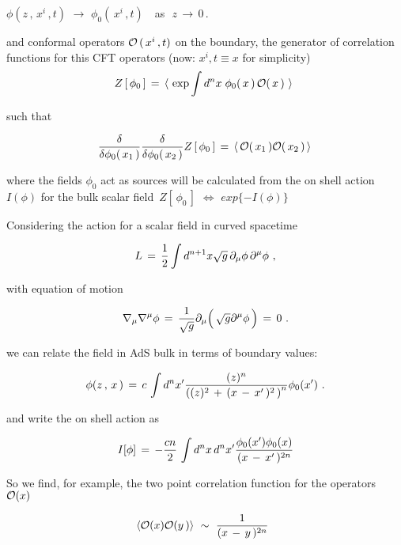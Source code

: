 \documentclass[a4paper,twocolumn,prd,groupedaddress,nofootinbib]{revtex4}
\begin{document}
\bigskip
 $\phi (z\,,\,x^i\,,t)\,\,\rightarrow\,\,
\phi_0 (\,x^i\,,t )\,\,\,\,$  
as  $\,\,z\,\rightarrow\,0\,$.

\vskip1cm

\noindent and conformal operators ${\cal O}\,(\,x^i\,,t )$ on the boundary, 
the generator of correlation functions for this  CFT operators
(now: $x^i,t \equiv x$ for simplicity) 
$$
Z\,[\,\phi_0 \,]\,=\, \langle \,\,\exp \int d^{n}x\; \phi_0 (\,x\,)\,
{\cal O} (\,x\,)\,\,\rangle\,\,
\nonumber
$$

\noindent such that


$$ 
{\delta\over \delta \phi_0 (\,x_1\,) } {\delta\over \delta \phi_0 (\,x_2\,) }
Z\,[\,\phi_0\,]\,=\,\langle \, { \cal O } (\,x_1\,){\cal O} (\,x_2\,)\,\rangle\,
$$
 
\bigskip

\noindent  where the fields $\phi_0 $ act as {\cal sources} will be calculated from
the on shell  action $I (\phi )$ for the bulk scalar field 
 $\,Z [\,\phi_0\,]\,\,\Longleftrightarrow\,\, exp \{ - I (\phi )\}  $



Considering the action for a scalar field in curved spacetime

$$L\,=\,{1\over 2} \int d^{n+1}x \sqrt{g} \,\partial_\mu \phi \,
\partial^\mu \phi
\,\,,\nonumber
$$

\noindent with equation of motion 

$$
\label{motion}
\nabla_\mu \nabla^\mu \phi\,=\,{1\over \sqrt{g}} \partial_\mu 
\Big( \, \sqrt{g} \partial^\mu \phi \,\Big) 
\,=\,0\,\,.
$$


\vskip1cm
\noindent we can relate the field in AdS bulk in terms of boundary values:

$$
\label{solution}
\phi ( z\,,\,x \,)\,=\,c\,\int d^n x^{\prime} 
{ (z)^n \over \left( (z)^2 \,+\,
( x \,-\,{ x}^\prime \,)^2\,\right)^n} 
\phi_ 0 ({x}^\prime )\,\,.
$$

\bigskip
\noindent and write the on shell action as

$$
I [\phi ] \,=\, - {c n\over 2} \,\int d^n x \,d^n x^\prime 
{\phi_ 0 ({x}^\prime )
\phi_ 0 ({x} ) \over ( x \,-\,{x}^\prime \,)^{2n}}
$$

\bigskip

\noindent So we find, for example, the two point correlation function for the operators  
${\cal O} ( x )\,\,$ 

\bigskip

$$ \langle {\cal O} ( x ) {\cal O} ( y \,) \rangle \,\,\sim
\,\,{ 1 \over ( x \,-\,y \,)^{2n}  }\,\,\,$$ 
\end{document}
